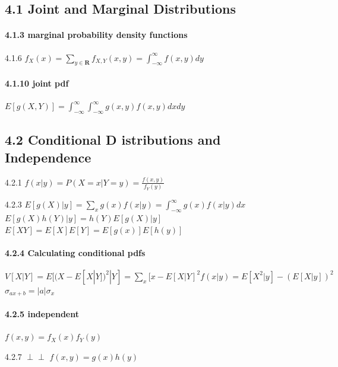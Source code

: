 \documentclass[6pt,twocolumn,Portrait]{article}
\let\oldparagraph\paragraph
\renewcommand{\paragraph}[1]{\oldparagraph{#1}\mbox{}}
\begin{document}
\hypertarget{joint-and-marginal-distributions}{%
\subsection{4.1 Joint and Marginal
Distributions}\label{joint-and-marginal-distributions}}

\hypertarget{marg}{%
\paragraph{4.1.3 marginal probability density functions}\label{marg}}

4.1.6
\(f_X(x)=\sum\limits_{y\in\mathbf{R}}f_{X,Y}(x,y)=\int_{-\infty}^{\infty}f(x,y)dy\)

\hypertarget{joint}{%
\paragraph{4.1.10 joint pdf}\label{joint}}

\(E[g(X,Y)]=\int_{-\infty}^{\infty}\int_{-\infty}^{\infty} g(x,y)f(x,y)dxdy\)

\hypertarget{conditional-d-istributions-and-independence}{%
\subsection{4.2 Conditional D istributions and
Independence}\label{conditional-d-istributions-and-independence}}

4.2.1 \(f(x|y)=P(X=x|Y=y)=\frac{f(x,y)}{f_Y(y)}\)

4.2.3
\(E[g(X)|y]=\sum\limits_xg(x)f(x|y)=\int_{-\infty}^{\infty}g(x)f(x|y)dx\)
\(E[g(X)h(Y)|y]=h(Y)E[g(X)|y]\) \(E[XY]=E[X]E[Y]=E[g(x)]E[h(y)]\)

\hypertarget{cond}{%
\paragraph{4.2.4 Calculating conditional pdfs}\label{cond}}

\(V[X|Y]=E[(X-E[X|Y])^2|Y]=\sum\limits_x [x-E[X|Y]^2 f(x|y)=E[X^2|y]-(E[X|y])^2\)
\(\sigma_{ax+b} =|a|\sigma_{x}\)

\hypertarget{indep-1}{%
\paragraph{4.2.5 independent}\label{indep-1}}

\(f(x,y)=f_X(x)f_Y(y)\)

4.2.7 \(\perp\!\!\!\perp\) \(f(x,y)=g(x)h(y)\)
\end{document}
